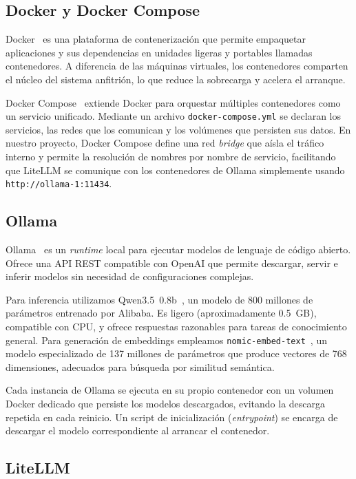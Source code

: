 \subsection{Docker y Docker Compose}

Docker~\cite{dockerOverview} es una plataforma de contenerización que permite empaquetar aplicaciones y sus dependencias en unidades ligeras y portables llamadas contenedores. A diferencia de las máquinas virtuales, los contenedores comparten el núcleo del sistema anfitrión, lo que reduce la sobrecarga y acelera el arranque.

Docker Compose~\cite{dockerComposeSpec} extiende Docker para orquestar múltiples contenedores como un servicio unificado. Mediante un archivo \texttt{docker-compose.yml} se declaran los servicios, las redes que los comunican y los volúmenes que persisten sus datos. En nuestro proyecto, Docker Compose define una red \textit{bridge} que aísla el tráfico interno y permite la resolución de nombres por nombre de servicio, facilitando que LiteLLM se comunique con los contenedores de Ollama simplemente usando \texttt{http://ollama-1:11434}.

\subsection{Ollama}

Ollama~\cite{ollama} es un \textit{runtime} local para ejecutar modelos de lenguaje de código abierto. Ofrece una API REST compatible con OpenAI que permite descargar, servir e inferir modelos sin necesidad de configuraciones complejas.

Para inferencia utilizamos Qwen3.5~0.8b~\cite{qwenModel}, un modelo de 800 millones de parámetros entrenado por Alibaba. Es ligero (aproximadamente 0.5~GB), compatible con CPU, y ofrece respuestas razonables para tareas de conocimiento general. Para generación de embeddings empleamos \texttt{nomic-embed-text}~\cite{nomicEmbed}, un modelo especializado de 137 millones de parámetros que produce vectores de 768 dimensiones, adecuados para búsqueda por similitud semántica.

Cada instancia de Ollama se ejecuta en su propio contenedor con un volumen Docker dedicado que persiste los modelos descargados, evitando la descarga repetida en cada reinicio. Un script de inicialización (\textit{entrypoint}) se encarga de descargar el modelo correspondiente al arrancar el contenedor.

\subsection{LiteLLM}

